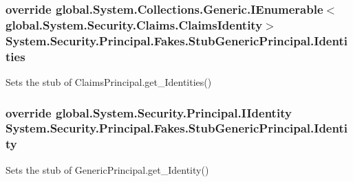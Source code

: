 \hypertarget{class_system_1_1_security_1_1_principal_1_1_fakes_1_1_stub_generic_principal_ab0ecdb9d7b23eb08c92d20cebbea194e}{
\subsubsection[{Identities}]{\setlength{\rightskip}{0pt plus 5cm}override global.\-System.\-Collections.\-Generic.\-I\-Enumerable$<$global.\-System.\-Security.\-Claims.\-Claims\-Identity$>$ System.\-Security.\-Principal.\-Fakes.\-Stub\-Generic\-Principal.\-Identities\hspace{0.3cm}{\ttfamily [get]}}}\label{class_system_1_1_security_1_1_principal_1_1_fakes_1_1_stub_generic_principal_ab0ecdb9d7b23eb08c92d20cebbea194e}


Sets the stub of Claims\-Principal.\-get\-\_\-\-Identities()

\hypertarget{class_system_1_1_security_1_1_principal_1_1_fakes_1_1_stub_generic_principal_a859534934e3f9da0113339af16b6e501}{
\subsubsection[{Identity}]{\setlength{\rightskip}{0pt plus 5cm}override global.\-System.\-Security.\-Principal.\-I\-Identity System.\-Security.\-Principal.\-Fakes.\-Stub\-Generic\-Principal.\-Identity\hspace{0.3cm}{\ttfamily [get]}}}\label{class_system_1_1_security_1_1_principal_1_1_fakes_1_1_stub_generic_principal_a859534934e3f9da0113339af16b6e501}


Sets the stub of Generic\-Principal.\-get\-\_\-\-Identity()

